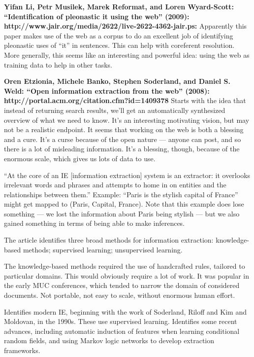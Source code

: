\textbf{Yifan Li, Petr Musilek, Marek Reformat, and Loren Wyard-Scott:
  ``Identification of pleonastic it using the web'' (2009):
  http://www.jair.org/media/2622/live-2622-4362-jair.ps:} Apparently
this paper makes use of the web as a corpus to do an excellent job of
identifying pleonastic uses of ``it'' in sentences.  This can help
with coreferent resolution.  More generally, this seems like an
interesting and powerful idea: using the web as training data to help
in other tasks.

\textbf{Oren Etzionia, Michele Banko, Stephen Soderland, and Daniel
  S. Weld: ``Open information extraction from the web'' (2008):
  http://portal.acm.org/citation.cfm?id=1409378} Starts with the idea
that instead of returning search results, we'll get an automatically
synthesized overview of what we need to know.  It's an interesting
motivating vision, but may not be a realistic endpoint.  It seems that
working on the web is both a blessing and a cure.  It's a curse
because of the open nature --- anyone can post, and so there is a lot
of misleading information.  It's a blessing, though, because of the
enormous scale, which gives us lots of data to use.

``At the core of an IE [information extraction] system is an
extractor: it overlooks irrelevant words and phrases and attempts to
home in on entities and the relationships between them.''  Example:
``Paris is the stylish capital of France'' might get mapped to (Paris,
Capital, France).  Note that this example does lose something --- we
lost the information about Paris being stylish --- but we also gained
something in terms of being able to make inferences.  

The article identifies three broad methods for information extraction:
knowledge-based methods; supervised learning; unsupervised learning.

The knowledge-based methods required the use of handcrafted rules,
tailored to particular domains.  This would obviously require a lot of
work.  It was popular in the early MUC conferences, which tended to
narrow the domain of considered documents.  Not portable, not easy to
scale, without enormous human effort.

Identifies modern IE, beginning with the work of Soderland, Riloff and
Kim and Moldovan, in the 1990s.  These use supervised learning.
Identifies some recent advances, including automatic induction of
features when learning conditional random fields, and using Markov
logic networks to develop extraction frameworks.  

